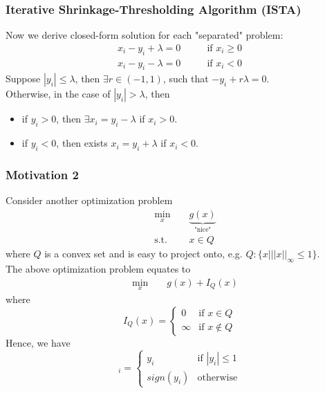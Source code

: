 \documentclass{beamer}
\begin{document}
\begin{frame}
\frametitle{Iterative Shrinkage-Thresholding Algorithm (ISTA)}
Now we derive closed-form solution for each "separated" problem: 
\begin{equation}
\begin{aligned}
    x_i-y_i + \lambda =0 & && \text{ if } x_i \geq 0 \\
    x_i-y_i - \lambda =0 & && \text{ if } x_i < 0
\end{aligned}
\end{equation}
Suppose $|y_i| \leq \lambda$, then $\exists r \in (-1,1)$, such that $-y_i + r \lambda = 0$.  \\
Otherwise, in the case of $|y_i| > \lambda$, then 
\begin{itemize}
    \item if $y_i > 0$, then $\exists x_i = y_i - \lambda$ if $x_i > 0$.
    \item if $y_i < 0$, then exists $x_i = y_i + \lambda$ if $x_i < 0$. 
\end{itemize}
\end{frame}

\begin{frame}
\frametitle{Motivation 2}
Consider another optimization problem
\begin{equation}
\begin{aligned}
    &  \underset{x}{\text{ min }}
    && \underbrace{g(x)}_{\text{"nice"}} \\
    &  \text{ s.t. } 
    && x \in Q
\end{aligned}
\end{equation}
where $Q$ is a convex set and is easy to project onto, e.g. $Q: \{ x| ||x||_{\infty} \leq 1 \}$. \\
The above optimization problem equates to 
\begin{equation}
\begin{aligned}
    &  \underset{x}{\text{ min }}
    && g(x) + I_Q(x) 
\end{aligned}
\end{equation}
where 
\begin{equation}
    I_Q (x) = 
   \begin{cases}
   0 &\mbox{if } x \in Q  \\
   \infty &\mbox{if } x \not \in Q
   \end{cases}
  \end{equation}
Hence, we have 
\begin{equation}
    [P_Q(y)]_i =
   \begin{cases}
   y_i &\mbox{if } |y_i| \leq 1  \\
   sign(y_i) &\mbox{otherwise} 
   \end{cases}
  \end{equation}

\end{frame}
\end{document}
